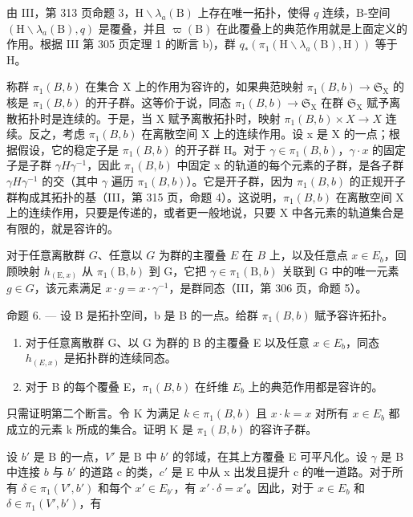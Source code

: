 由 III，第 313 页命题 3，\(\mathrm{H}\backslash\lambda_{a}(\mathrm{B})\) 上存在唯一拓扑，使得 \(q\) 连续，B-空间 \((\mathrm{H}\backslash\lambda_{a}(\mathrm{B}),q)\) 是覆叠，并且 \(\varpi(\mathrm{B})\) 在此覆叠上的典范作用就是上面定义的作用。根据 III 第 305 页定理 1 的断言 b)，群 \(q_{*}(\pi_{1}(\mathrm{H}\backslash\lambda_{a}(\mathrm{B}),\mathrm{H}))\) 等于 H。

称群 \(\pi_1(B, b)\) 在集合 X 上的作用为容许的，如果典范映射 \(\pi_1(B, b) \to \mathfrak{S}_{\mathrm{X}}\) 的核是 \(\pi_1(B, b)\) 的开子群。这等价于说，同态 \(\pi_1(B, b) \to \mathfrak{S}_{\mathrm{X}}\) 在群 \(\mathfrak{S}_{\mathrm{X}}\) 赋予离散拓扑时是连续的。于是，当 X 赋予离散拓扑时，映射 \(\pi_1(B, b) \times X \to X\) 连续。反之，考虑 \(\pi_{1}(B,b)\) 在离散空间 X 上的连续作用。设 x 是 X 的一点；根据假设，它的稳定子是 \(\pi_{1}(B,b)\) 的开子群 H。对于 \(\gamma\in\pi_{1}(B,b)\)，\(\gamma\cdot x\) 的固定子是子群 \(\gamma H\gamma^{-1}\)，因此 \(\pi_{1}(B,b)\) 中固定 x 的轨道的每个元素的子群，是各子群 \(\gamma H\gamma^{-1}\) 的交（其中 \(\gamma\) 遍历 \(\pi_{1}(B,b)\)）。它是开子群，因为 \(\pi_{1}(B,b)\) 的正规开子群构成其拓扑的基（III，第 315 页，命题 4）。这说明，\(\pi_{1}(B,b)\) 在离散空间 X 上的连续作用，只要是传递的，或者更一般地说，只要 X 中各元素的轨道集合是有限的，就是容许的。

对于任意离散群 \(G\)、任意以 \(G\) 为群的主覆叠 \(E\) 在 \(B\) 上，以及任意点 \(x \in E_{b}\)，回顾映射 \(h_{(\mathrm{E},x)}\) 从 \(\pi_{1}(\mathrm{B},b)\) 到 G，它把 \(\gamma \in \pi_{1}(\mathrm{B},b)\) 关联到 G 中的唯一元素 \(g \in G\)，该元素满足 \(x \cdot g = x \cdot \gamma^{-1}\)，是群同态（III，第 306 页，命题 5）。

命题 6. --- 设 B 是拓扑空间，b 是 B 的一点。给群 \(\pi_1(B, b)\) 赋予容许拓扑。

\begin{enumerate}
\def\labelenumi{\alph{enumi})}
\item
  对于任意离散群 G、以 G 为群的 B 的主覆叠 E 以及任意 \(x \in E_{b}\)，同态 \(h_{(E,x)}\) 是拓扑群的连续同态。
\item
  对于 B 的每个覆叠 E，\(\pi_{1}(B,b)\) 在纤维 \(E_{b}\) 上的典范作用都是容许的。
\end{enumerate}

只需证明第二个断言。令 K 为满足 \(k \in \pi_{1}(B, b)\) 且 \(x \cdot k = x\) 对所有 \(x \in E_{b}\) 都成立的元素 k 所成的集合。证明 K 是 \(\pi_{1}(B, b)\) 的容许子群。

设 \(b'\) 是 B 的一点，\(V'\) 是 B 中 \(b'\) 的邻域，在其上方覆叠 E 可平凡化。设 \(\gamma\) 是 B 中连接 \(b\) 与 \(b'\) 的道路 c 的类，\(c'\) 是 E 中从 x 出发且提升 c 的唯一道路。对于所有 \(\delta \in \pi_1(V', b')\) 和每个 \(x' \in E_{b'}\)，有 \(x' \cdot \delta = x'\)。因此，对于 \(x \in E_b\) 和 \(\delta \in \pi_1(V', b')\)，有

